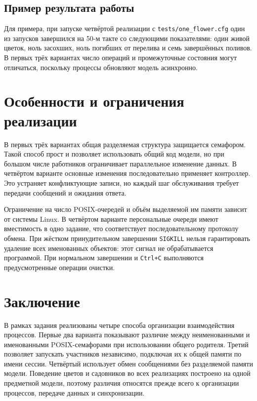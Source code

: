 \documentclass[12pt,a4paper]{article}
\begin{document}
\subsection{Пример результата работы}
Для примера, при запуске четвёртой реализации с \texttt{tests/one\_flower.cfg} один из запусков завершился на 50-м такте со следующими показателями: один живой цветок, ноль засохших, ноль погибших от перелива и семь завершённых поливов. В первых трёх вариантах число операций и промежуточные состояния могут отличаться, поскольку процессы обновляют модель асинхронно.

\section{Особенности и ограничения реализации}
В первых трёх вариантах общая разделяемая структура защищается семафором. Такой способ прост и позволяет использовать общий код модели, но при большом числе работников ограничивает параллельное изменение данных. В четвёртом варианте основные изменения последовательно применяет контроллер. Это устраняет конфликтующие записи, но каждый шаг обслуживания требует передачи сообщений и ожидания ответа.

Ограничение на число POSIX-очередей и объём выделяемой им памяти зависит от системы Linux. В четвёртом варианте персональные очереди имеют вместимость в одно задание, что соответствует последовательному протоколу обмена. При жёстком принудительном завершении \texttt{SIGKILL} нельзя гарантировать удаление всех именованных объектов: этот сигнал не обрабатывается программой. При нормальном завершении и \texttt{Ctrl+C} выполняются предусмотренные операции очистки.

\section{Заключение}
В рамках задания реализованы четыре способа организации взаимодействия процессов. Первые два варианта показывают различие между неименованными и именованными POSIX-семафорами при использовании общего родителя. Третий позволяет запускать участников независимо, подключая их к общей памяти по имени сессии. Четвёртый использует обмен сообщениями без разделяемой памяти модели. Поведение цветов и садовников во всех реализациях построено на одной предметной модели, поэтому различия относятся прежде всего к организации процессов, передаче данных и синхронизации.
\end{document}
